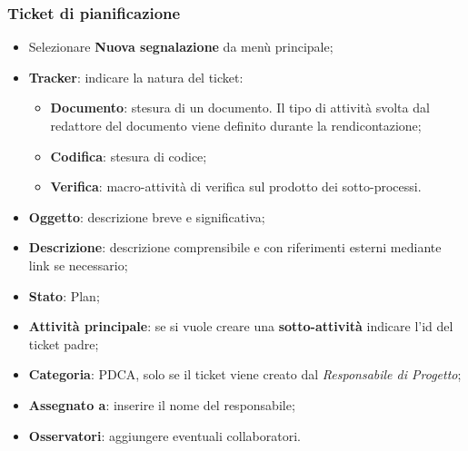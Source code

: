 \documentclass[a4paper,12pt]{article}
\begin{document}
\subsubsection{Ticket di pianificazione}
{
\begin{itemize}


\item Selezionare \textbf{Nuova segnalazione} da menù principale; 
\item \textbf{Tracker}: indicare la natura del ticket: 
	\begin{itemize}
	\item \textbf{Documento}: stesura di un documento. Il tipo di attività svolta dal redattore del documento viene definito durante la rendicontazione; 
	\item \textbf{Codifica}: stesura di codice; 
	\item \textbf{Verifica}: macro-attività di verifica sul prodotto dei sotto-processi. 


	\end{itemize}

\item \textbf{Oggetto}: descrizione breve e significativa; 
\item \textbf{Descrizione}: descrizione comprensibile e con riferimenti esterni mediante link se necessario; 
\item \textbf{Stato}: Plan; 
\item \textbf{Attività principale}: se si vuole creare una \textbf{sotto-attività} indicare l’id del ticket 
padre; 
\item \textbf{Categoria}: PDCA, solo se il ticket viene creato dal \emph{Responsabile di Progetto}; 
\item \textbf{Assegnato a}: inserire il nome del responsabile; 
\item \textbf{Osservatori}: aggiungere eventuali collaboratori.
\end{itemize}  
}
\end{document}
